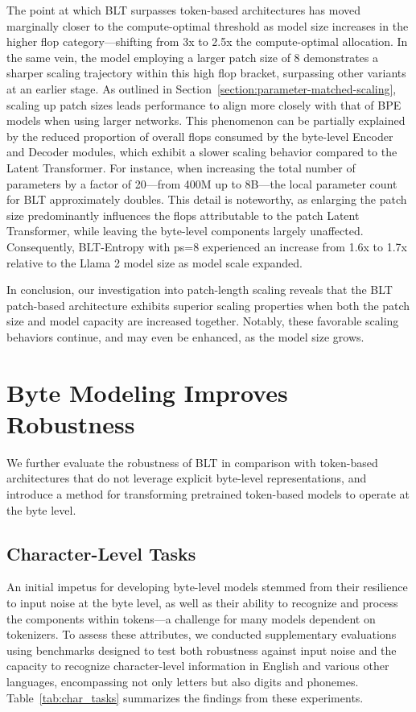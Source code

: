 The point at which {\textsc BLT} surpasses token-based architectures has moved marginally closer to the compute-optimal threshold as model size increases in the higher flop category—shifting from 3x to 2.5x the compute-optimal allocation. In the same vein, the model employing a larger patch size of 8 demonstrates a sharper scaling trajectory within this high flop bracket, surpassing other variants at an earlier stage. As outlined in Section~\ref{section:parameter-matched-scaling}, scaling up patch sizes leads performance to align more closely with that of BPE models when using larger networks. This phenomenon can be partially explained by the reduced proportion of overall flops consumed by the byte-level Encoder and Decoder modules, which exhibit a slower scaling behavior compared to the Latent Transformer. For instance, when increasing the total number of parameters by a factor of 20—from 400M up to 8B—the local parameter count for {\textsc BLT} approximately doubles. This detail is noteworthy, as enlarging the patch size predominantly influences the flops attributable to the patch Latent Transformer, while leaving the byte-level components largely unaffected. Consequently, {\textsc BLT}-Entropy with ps=8 experienced an increase from 1.6x to 1.7x relative to the Llama 2 model size as model scale expanded.

In conclusion, our investigation into patch-length scaling reveals that the {\textsc BLT} patch-based architecture exhibits superior scaling properties when both the patch size and model capacity are increased together. Notably, these favorable scaling behaviors continue, and may even be enhanced, as the model size grows.

\section{Byte Modeling Improves Robustness} We further evaluate the robustness of {\textsc BLT} in comparison with token-based architectures that do not leverage explicit byte-level representations, and introduce a method for transforming pretrained token-based models to operate at the byte level.
\label{sec:robustness}

\subsection{Character-Level Tasks}

An initial impetus for developing byte-level models stemmed from their resilience to input noise at the byte level, as well as their ability to recognize and process the components within tokens—a challenge for many models dependent on tokenizers. To assess these attributes, we conducted supplementary evaluations using benchmarks designed to test both robustness against input noise and the capacity to recognize character-level information in English and various other languages, encompassing not only letters but also digits and phonemes. Table~\ref{tab:char_tasks} summarizes the findings from these experiments.

